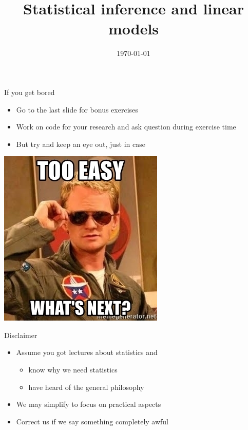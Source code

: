 \documentclass[10pt]{beamer}\usepackage[]{graphicx}\usepackage[]{color}
\title[\textbf{Linear models}]{Statistical inference and linear models}
\date{\today}
\begin{document}
\begin{frame}
\maketitle	
\end{frame}


\begin{frame}{If you get bored}
  \begin{itemize}
    \item Go to the last slide for bonus exercises
    \item Work on code for your research and ask question during exercise time
    \item But try and keep an eye out, just in case
  \end{itemize}
  
  \begin{center}
    \includegraphics[height=0.5\textheight]{Figures/too-easy-whats-next.jpg}
  \end{center}
\end{frame}

\begin{frame}{Disclaimer}
  \begin{itemize}
    \item Assume you got lectures about statistics and
       \begin{itemize}
        \item know why we need statistics
        \item have heard of the general philosophy
       \end{itemize}
    \item We may simplify to focus on practical aspects
    \item Correct us if we say something completely awful
  \end{itemize}
  
\end{frame}
\end{document}

